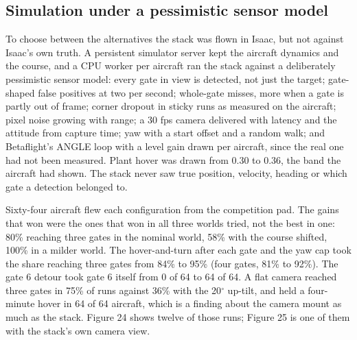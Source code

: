 \documentclass{article}
\begin{document}
\subsection{Simulation under a pessimistic sensor model}
To choose between the alternatives the stack was flown in Isaac, but not against Isaac's own truth. A persistent simulator server kept the aircraft dynamics and the course, and a CPU worker per aircraft ran the stack against a deliberately pessimistic sensor model: every gate in view is detected, not just the target; gate-shaped false positives at two per second; whole-gate misses, more when a gate is partly out of frame; corner dropout in sticky runs as measured on the aircraft; pixel noise growing with range; a 30 fps camera delivered with latency and the attitude from capture time; yaw with a start offset and a random walk; and Betaflight's ANGLE loop with a level gain drawn per aircraft, since the real one had not been measured. Plant hover was drawn from 0.30 to 0.36, the band the aircraft had shown. The stack never saw true position, velocity, heading or which gate a detection belonged to.

Sixty-four aircraft flew each configuration from the competition pad. The gains that won were the ones that won in all three worlds tried, not the best in one: 80\% reaching three gates in the nominal world, 58\% with the course shifted, 100\% in a milder world. The hover-and-turn after each gate and the yaw cap took the share reaching three gates from 84\% to 95\% (four gates, 81\% to 92\%). The gate 6 detour took gate 6 itself from 0 of 64 to 64 of 64. A flat camera reached three gates in 75\% of runs against 36\% with the 20$^\circ$ up-tilt, and held a four-minute hover in 64 of 64 aircraft, which is a finding about the camera mount as much as the stack. Figure 24 shows twelve of those runs; Figure 25 is one of them with the stack's own camera view.
\end{document}
